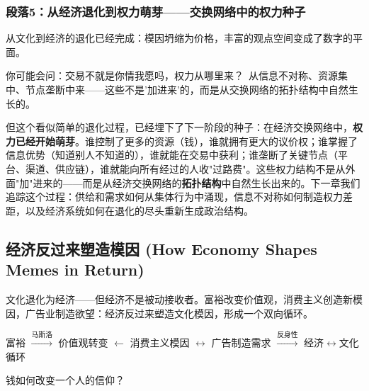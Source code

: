\documentclass[../main.tex]{subfiles}
\begin{document}
	\subsubsection*{段落5：从经济退化到权力萌芽——交换网络中的权力种子}

	从文化到经济的退化已经完成：模因坍缩为价格，丰富的观点空间变成了数字的平面。

	\begin{tcolorbox}[colback=yellow!5, title=\textit{读者行为预测}]

		你可能会问：交易不就是你情我愿吗，权力从哪里来？\ 从信息不对称、资源集中、节点垄断中来——这些不是'加进来'的，而是从交换网络的拓扑结构中自然生长的。

	\end{tcolorbox}

但这个看似简单的退化过程，已经埋下了下一阶段的种子：在经济交换网络中，\textbf{权力已经开始萌芽}。谁控制了更多的资源（钱），谁就拥有更大的议价权；谁掌握了信息优势（知道别人不知道的），谁就能在交易中获利；谁垄断了关键节点（平台、渠道、供应链），谁就能向所有经过的人收"过路费"。这些权力结构不是从外面"加"进来的——而是从经济交换网络的\textbf{拓扑结构}中自然生长出来的。下一章我们追踪这个过程：供给和需求如何从集体行为中涌现，信息不对称如何制造权力差距，以及经济系统如何在退化的尽头重新生成政治结构。

	\subsection{经济反过来塑造模因 (How Economy Shapes Memes in Return)}

	\begin{motivation}

		文化退化为经济——但经济不是被动接收者。富裕改变价值观，消费主义创造新模因，广告业制造欲望：经济反过来塑造文化模因，形成一个双向循环。

	\end{motivation}

	\begin{logicmap}

		富裕 $\xrightarrow{\text{马斯洛}}$ 价值观转变 $\leftarrow$ 消费主义模因 $\leftrightarrow$ 广告制造需求 $\xrightarrow{\text{反身性}}$ 经济$\leftrightarrow$文化循环

	\end{logicmap}

	\begin{questionbox}

		钱如何改变一个人的信仰？

	\end{questionbox}
\end{document}
